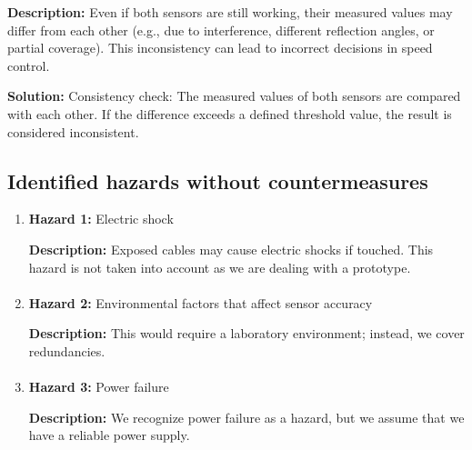 \begin{enumerate}
            \textbf{Description:} Even if both sensors are still working, their measured values may differ from each other (e.g., due to interference, different reflection angles, or partial coverage). This inconsistency can lead to incorrect decisions in speed control.
            
            \textbf{Solution:} Consistency check: The measured values of both sensors are compared with each other. If the difference exceeds a defined threshold value, the result is considered inconsistent.
        
        \paragraph{}
	\end{enumerate}
	
\subsection{Identified hazards without countermeasures }

	\begin{enumerate}
		\item \textbf{Hazard 1:} Electric shock

            \textbf{Description:} Exposed cables may cause electric shocks if touched. This hazard is not taken into account as we are dealing with a prototype.
            
        \paragraph{}
		\item \textbf{Hazard 2:} Environmental factors that affect sensor accuracy
        
            \textbf{Description:} This would require a laboratory environment; instead, we cover redundancies.

        \paragraph{}
		\item \textbf{Hazard 3:} Power failure
        
            \textbf{Description:} We recognize power failure as a hazard, but we assume that we have a reliable power supply.


	\end{enumerate}